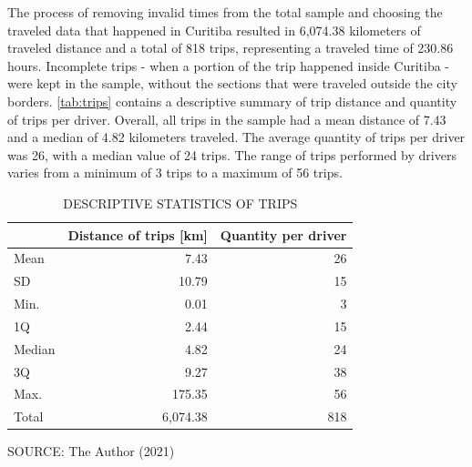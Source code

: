 The process of removing invalid times from the total sample and choosing the traveled data that happened in Curitiba resulted in 6,074.38 kilometers of traveled distance and a total of 818 trips, representing a traveled time of 230.86 hours. Incomplete trips - when a portion of the trip happened inside Curitiba - were kept in the sample, without the sections that were traveled outside the city borders. \autoref{tab:trips} contains a descriptive summary of trip distance and quantity of trips per driver. Overall, all trips in the sample had a mean distance of 7.43 and a median of 4.82 kilometers traveled. The average quantity of trips per driver was 26, with a median value of 24 trips. The range of trips performed by drivers varies from a minimum of 3 trips to a maximum of 56 trips. 

\begin{table}[!htbp]
    \footnotesize
    \captionsetup{justification=raggedright, singlelinecheck=false,
    font=footnotesize}
    \caption{DESCRIPTIVE STATISTICS OF TRIPS}
    \centering
    \begin{tabular}{lrr}
        \hline
         & \multicolumn{1}{c}{\textbf{Distance of trips [km]}} & \multicolumn{1}{c}{\textbf{Quantity per driver}} \\
        \hline
        Mean   &     7.43 & 26 \\
        SD     &    10.79 & 15 \\
        Min.   &     0.01 &  3 \\
        1Q     &     2.44 & 15 \\
        Median &     4.82 & 24 \\
        3Q     &     9.27 & 38 \\
        Max.   &   175.35 & 56 \\
        \hline
        Total  & 6,074.38 & 818 \\
        \hline
    \end{tabular}
    \label{tab:trips}
    \par \vspace{2mm} \footnotesize \raggedright
    SOURCE: The Author (2021)
\end{table}

